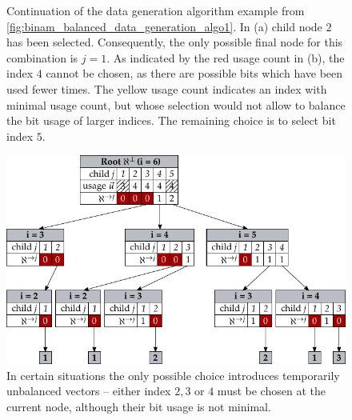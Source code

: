 \begin{figure}
{		\label{fig:binam_balanced_data_generation_algo2_b}
	}
	\caption[Balanced data generation algorithm example 2]{Continuation of the data generation algorithm example from \cref{fig:binam_balanced_data_generation_algo1}. In (a) child node $2$ has been selected. Consequently, the only possible final node for this combination is $j = 1$. As indicated by the red usage count in (b), the index $4$ cannot be chosen, as there are possible bits which have been used fewer times. The yellow usage count indicates an index with minimal usage count, but whose selection would not allow to balance the bit usage of larger indices. The remaining choice is to select bit index $5$.}
	\label{fig:binam_balanced_data_generation_algo2}
\end{figure}
\begin{figure}
	\centering
	\includegraphics{media/chp3/data_generation/out/algorithm_019_cropped.pdf}
	\caption[Balanced data generation algorithm example 3]{In certain situations the only possible choice introduces temporarily unbalanced vectors -- either index $2, 3$ or $4$ must be chosen at the current node, although their bit usage is not minimal.}
	\label{fig:binam_balanced_data_generation_algo3}
\end{figure}

